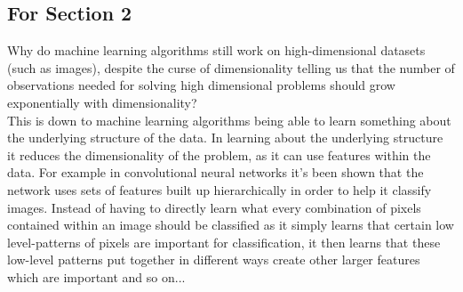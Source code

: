 \begin{appendices}
\subsection{For Section 2}
\begin{question}
    Why do machine learning algorithms still work on high-dimensional datasets (such as images), despite the curse of dimensionality telling us that the number of observations needed for solving high dimensional problems should grow exponentially with dimensionality? \\
    This is down to machine learning algorithms being able to learn something about the underlying structure of the data. In learning about the underlying structure it reduces the dimensionality of the problem, as it can use features within the data. For example in convolutional neural networks it's been shown that the network uses sets of features built up hierarchically in order to help it classify images. Instead of having to directly learn what every combination of pixels contained within an image should be classified as it simply learns that certain low level-patterns of pixels are important for classification, it then learns that these low-level patterns put together in different ways create other larger features which are important and so on...
\end{question}

\end{appendices}